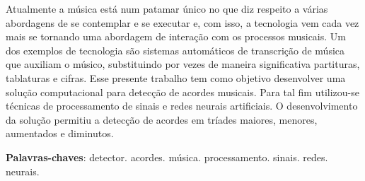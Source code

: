 \begin{resumo}
 Atualmente a música está num patamar único no que diz respeito a várias abordagens de se contemplar e se executar e, com isso, a tecnologia vem cada vez mais se tornando uma abordagem de interação com os processos musicais. Um dos exemplos de tecnologia são sistemas automáticos de transcrição de música que auxiliam o músico, substituindo por vezes de maneira significativa partituras, tablaturas e cifras. Esse presente trabalho tem como objetivo desenvolver uma solução computacional para detecção de acordes musicais. Para tal fim utilizou-se técnicas de processamento de sinais e redes neurais artificiais. O desenvolvimento da solução permitiu a detecção de acordes em tríades maiores, menores, aumentados e diminutos.

 \vspace{\onelineskip}
    
 \noindent
 \textbf{Palavras-chaves}: detector. acordes. música. processamento. sinais. redes. neurais.
\end{resumo}

